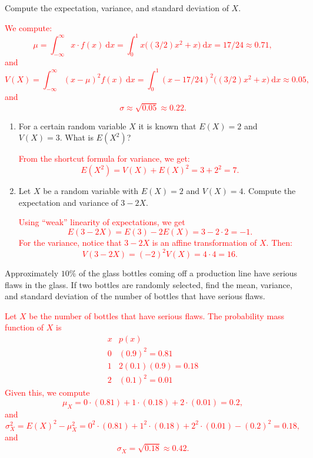 \documentclass[12pt,reqno]{amsart}
\begin{document}
Compute the expectation, variance, and standard deviation of $X$.

\bigskip
\textcolor{red}{We compute:
	\[
	\mu = \int_{-\infty}^\infty x\cdot f(x) \ \text{d} x = \int_0^1 x\big((3/2)x^2+x \big) \ \text{d} x = 17/24 \approx 0.71,
	\]
and
	\[
	V(X) = \int_{-\infty}^\infty (x-\mu)^2f(x) \ \text{d} x = \int_0^1 (x-17/24)^2 \big( (3/2)x^2+x\big) \ \text{d}x \approx 0.05,
	\]
and
	\[
	\sigma \approx \sqrt{0.05} \approx 0.22.
	\]}












\bigskip
\prob

\begin{enumerate}
\item For a certain random variable $X$ it is known that $E(X)=2$ and $V(X) = 3$. What is $E(X^2)$?
    
\bigskip
\textcolor{red}{From the shortcut formula for variance, we get:
    	\[
	E(X^2) = V(X) + E(X)^2 = 3 + 2^2 = 7.
	\]}
\bigskip


\item Let $X$ be a random variable with $E(X)=2$ and $V(X)=4$. Compute the expectation and variance of $3-2X$.
    
\bigskip
\textcolor{red}{Using ``weak'' linearity of expectations, we get
    	\[
	E(3-2X) = E(3) -2 E(X) = 3 - 2\cdot 2 = -1.
	\]
    For the variance, notice that $3-2X$ is an affine transformation of $X$. Then:
    	\[
	V(3-2X) = (-2)^2 V(X) = 4\cdot 4 = 16.
	\]}
\end{enumerate}















\bigskip
\prob Approximately $10\%$ of the glass bottles coming off a production line have serious flaws in the glass. If two bottles are randomly selected, find the mean, variance, and standard deviation of the number of bottles that have serious flaws.

\bigskip
\textcolor{red}{Let $X$ be the number of bottles that have serious flaws. The probability mass function of $X$ is
	\[
	\begin{array}{c|c}
	x & p(x) \\ \hline
	0 & (0.9)^2 = 0.81   \\
	1 & 2(0.1)(0.9) = 0.18   \\
	2 & (0.1)^2 = 0.01
	\end{array}
	\]
Given this, we compute
	\[
	\mu_X = 0\cdot(0.81) + 1\cdot(0.18) + 2\cdot(0.01) = 0.2,
	\]
and
	\[
	\sigma^2_X = E(X)^2 - \mu^2_X = 0^2 \cdot(0.81)+ 1^2\cdot (0.18) + 2^2 \cdot(0.01) - (0.2)^2 = 0.18,
	\]
and
	\[
	\sigma_X = \sqrt{0.18} \approx 0.42.
	\]}
\bigskip
\end{document}
